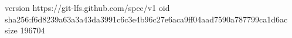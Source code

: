 version https://git-lfs.github.com/spec/v1
oid sha256:f6d8239a63a3a43da3991c6c3e4b96c27e6aca9ff04aad7590a787799ca1d6ac
size 196704

